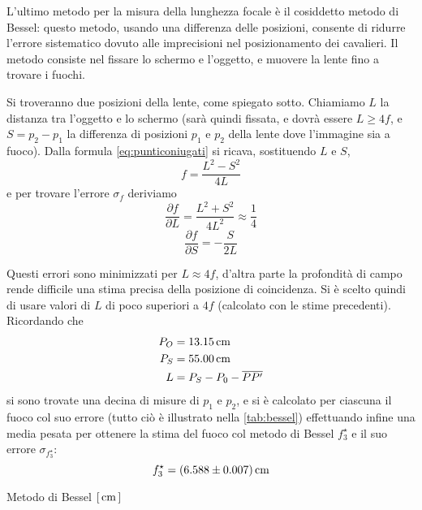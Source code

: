 L'ultimo metodo per la misura della lunghezza focale è il cosiddetto 
metodo di Bessel: questo metodo, usando una differenza delle 
posizioni, consente di ridurre l'errore sistematico dovuto alle 
imprecisioni nel posizionamento dei cavalieri. Il metodo consiste 
nel fissare lo schermo e l'oggetto, e muovere la lente fino a 
trovare i fuochi. 

Si troveranno due posizioni della lente, come spiegato sotto. Chiamiamo 
$L$ la distanza tra l'oggetto e lo schermo (sarà quindi fissata, e 
dovrà essere $L \geq 4f$, e $S=p_2-p_1$ la differenza di posizioni $p_1$ e $p_2$ della 
lente dove l'immagine sia a fuoco).  Dalla formula \eqref{eq:punticoniugati} si ricava, 
sostituendo $L$ e $S$,
\begin{equation}
f = \frac{L^2-S^2}{4L}
\end{equation}
e per trovare l'errore $\sigma_f$ deriviamo
\begin{equation*} \label{eq:dfdl}
\frac{\partial f}{\partial L} = \frac{L^2+S^2}{4L^2} \approx \frac{1}{4}
\end{equation*}
\begin{equation*}
\frac{\partial f}{\partial S} = -\frac{S}{2L}
\end{equation*}

Questi errori sono minimizzati per $L \approx 4f$, d'altra parte la 
profondità di campo rende difficile una stima precisa della 
posizione di coincidenza. Si \`e scelto quindi di usare valori di $L$ di poco 
superiori a $4f$ (calcolato con le stime precedenti). 
Ricordando che
\begin{align}
	 P_O &= 13.15 \,\mathrm{cm} \\
	 P_S &= 55.00 \,\mathrm{cm} \\
	 L &= P_S -P_0 -\overline{PP'}
\end{align}
si sono trovate una decina di misure di $p_1$ e 
$p_2$, e si \`e calcolato per ciascuna il fuoco col suo errore 
(tutto ciò è illustrato nella \autoref{tab:bessel}) effettuando 
infine una media pesata per ottenere la stima del fuoco col metodo 
di Bessel $f^{\star}_3$ e il suo errore $\sigma_{f^{\star}_3}$:
\begin{equation}
f^{\star}_3 = (6.588 \pm 0.007) \,\mathrm{cm}
\end{equation}
\begin{tabella}
	\centering
	
	\caption{Metodo di Bessel $[\,\mathrm{cm}\,]$}
	\label{tab:bessel}
\end{tabella}
